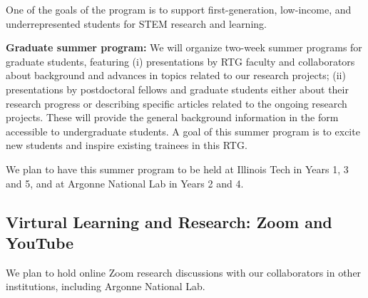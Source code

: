 \documentclass[11pt]{NSFamsart}
\begin{document}
One of the goals of the program is to support first-generation,
low-income, and underrepresented students for STEM research and learning.

 
 
\noindent
\textbf{Graduate summer program:} We will organize two-week summer programs for  graduate students, featuring (i) presentations by RTG faculty and collaborators about background and advances  in topics related to our research  projects; (ii) presentations by postdoctoral fellows and graduate students either about their research progress or describing specific articles related to the ongoing research projects. These will provide the general background
information in the form accessible to undergraduate students.  A goal of   this summer program is to excite new students and inspire existing trainees in this RTG. 

We plan to have this summer program to be held at Illinois Tech in Years 1, 3 and 5, and at Argonne National Lab in Years 2 and 4. 


 
 
\subsection{Virtural Learning and Research: Zoom and YouTube}
We plan to hold  online Zoom research discussions  with our collaborators in other institutions, including Argonne National Lab.    
\end{document}

